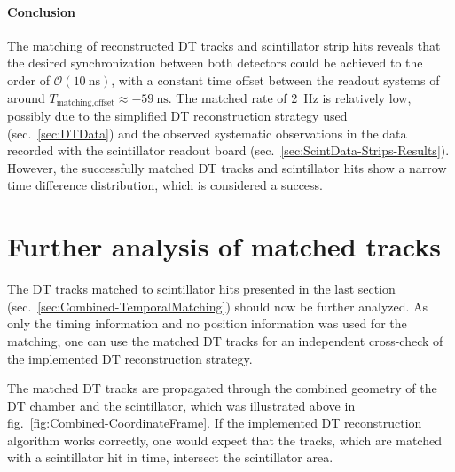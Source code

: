 \paragraph{Conclusion}
The matching of reconstructed \ac{DT} tracks and scintillator strip hits reveals that the desired synchronization between both detectors could be achieved to the order of $\mathcal{O}(\SI{10}{\nano\second})$, with a constant time offset between the readout systems of around $T_\text{matching,offset}\approx\SI{-59}{\nano\second}$. The matched rate of \SI{2}{\hertz} is relatively low, possibly due to the simplified \ac{DT} reconstruction strategy used (sec.\ \ref{sec:DTData}) and the observed systematic observations in the data recorded with the scintillator readout board (sec.\ \ref{sec:ScintData-Strips-Results}). However, the successfully matched \ac{DT} tracks and scintillator hits show a narrow time difference distribution, which is considered a success.

\FloatBarrier
\section{Further analysis of matched tracks}
\label{sec:Combined-MatchedHitAnalysis}
The \ac{DT} tracks matched to scintillator hits presented in the last section (sec.\ \ref{sec:Combined-TemporalMatching}) should now be further analyzed. As only the timing information and no position information was used for the matching, one can use the matched \ac{DT} tracks for an independent cross-check of the implemented \ac{DT} reconstruction strategy.
\par The matched \ac{DT} tracks are propagated through the combined geometry of the \ac{DT} chamber and the scintillator, which was illustrated above in fig.\ \ref{fig:Combined-CoordinateFrame}. If the implemented \ac{DT} reconstruction algorithm works correctly, one would expect that the tracks, which are matched with a scintillator hit in time, intersect the scintillator area.
